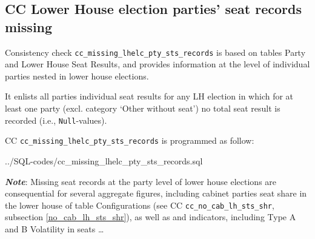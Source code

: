 \subsection{CC Lower House election parties' seat records missing}\label{cc_missing_lhelc_pty_sts_records}
Consistency check \texttt{\footnotesize cc\_missing\_lhelc\_pty\_sts\_records} is based on tables Party and Lower House Seat Results, and provides information at the level of individual parties nested in lower house elections. 

It enlists all parties individual seat results for any LH election in which for at least one party (excl. category `Other without seat') no total seat result is recorded (i.e., \texttt{\footnotesize Null}-values).			

CC \texttt{\footnotesize cc\_missing\_lhelc\_pty\_sts\_records} is programmed as follow: 

%
{../SQL-codes/cc_missing_lhelc_pty_sts_records.sql}

{\em \bf Note}: Missing seat records at the party level of lower house elections are consequential for several aggregate figures, including cabinet parties seat share in the lower house of table Configurations (see CC \texttt{\footnotesize cc\_no\_cab\_lh\_sts\_shr}, subsection \ref{no_cab_lh_sts_shr}), as well as and indicators, including Type A and B Volatility in seats \ldots

